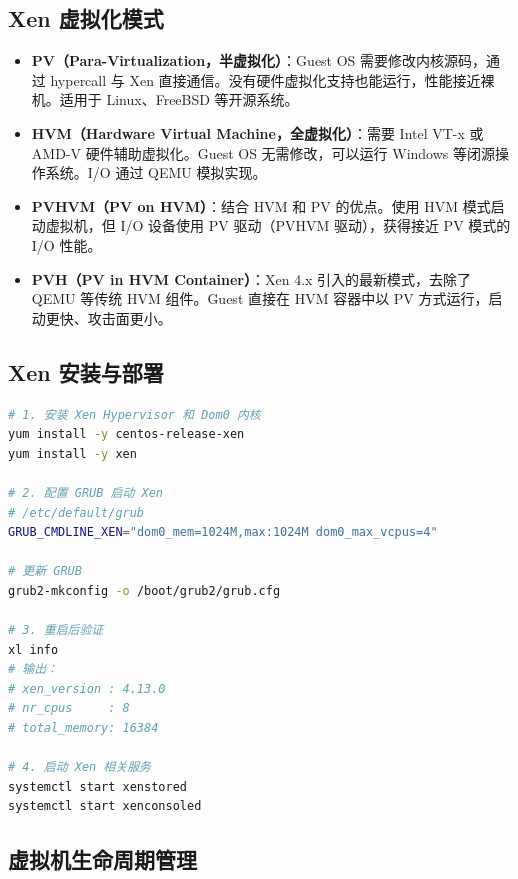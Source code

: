 \documentclass[12pt,UTF8]{ctexbook}
\begin{document}
\subsection*{Xen 虚拟化模式}

\begin{itemize}
    \item \textbf{PV（Para-Virtualization，半虚拟化）}：Guest OS 需要修改内核源码，通过 hypercall 与 Xen 直接通信。没有硬件虚拟化支持也能运行，性能接近裸机。适用于 Linux、FreeBSD 等开源系统。
    \item \textbf{HVM（Hardware Virtual Machine，全虚拟化）}：需要 Intel VT-x 或 AMD-V 硬件辅助虚拟化。Guest OS 无需修改，可以运行 Windows 等闭源操作系统。I/O 通过 QEMU 模拟实现。
    \item \textbf{PVHVM（PV on HVM）}：结合 HVM 和 PV 的优点。使用 HVM 模式启动虚拟机，但 I/O 设备使用 PV 驱动（PVHVM 驱动），获得接近 PV 模式的 I/O 性能。
    \item \textbf{PVH（PV in HVM Container）}：Xen 4.x 引入的最新模式，去除了 QEMU 等传统 HVM 组件。Guest 直接在 HVM 容器中以 PV 方式运行，启动更快、攻击面更小。
\end{itemize}

\subsection*{Xen 安装与部署}

\begin{lstlisting}[language=bash]
# 1. 安装 Xen Hypervisor 和 Dom0 内核
yum install -y centos-release-xen
yum install -y xen

# 2. 配置 GRUB 启动 Xen
# /etc/default/grub
GRUB_CMDLINE_XEN="dom0_mem=1024M,max:1024M dom0_max_vcpus=4"

# 更新 GRUB
grub2-mkconfig -o /boot/grub2/grub.cfg

# 3. 重启后验证
xl info
# 输出：
# xen_version : 4.13.0
# nr_cpus     : 8
# total_memory: 16384

# 4. 启动 Xen 相关服务
systemctl start xenstored
systemctl start xenconsoled
\end{lstlisting}

\subsection*{虚拟机生命周期管理}
\end{document}
